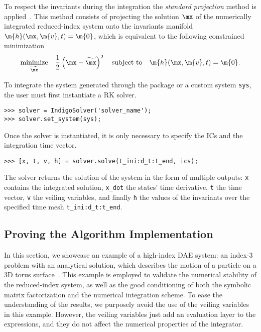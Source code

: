 To respect the invariants during the integration the \emph{standard projection} method is applied~\cite{hairer2000symmetric}. This method consists of projecting the solution $\mx$ of the numerically integrated reduced-index system onto the invariants manifold $\m{h}(\mx, \m{v}, t) = \m{0}$, which is equivalent to the following constrained minimization
%
\begin{equation*}
  \underset{\widetilde{\mx}}{\textrm{minimize}} \quad \dfrac{1}{2}\left(\mx - \widetilde{\mx}\right)^2
    \quad \textrm{subject to} \quad
    \m{h}(\mx, \m{v}, t) = \m{0}.
\end{equation*}

To integrate the system generated through the \Matlab{} package or a custom system \texttt{sys}, the user must first instantiate a \Indigo{} \ac{RK} solver.
%
\begin{verbatim}
>>> solver = IndigoSolver('solver_name');
>>> solver.set_system(sys);
\end{verbatim}
%
Once the solver is instantiated, it is only necessary to specify the \acp{IC} and the integration time vector.
%
\begin{verbatim}
>>> [x, t, v, h] = solver.solve(t_ini:d_t:t_end, ics);
\end{verbatim}
%
The solver returns the solution of the system in the form of multiple outputs: \texttt{x} contains the integrated solution, \texttt{x\_dot} the states' time derivative, \texttt{t} the time vector, \texttt{v} the veiling variables, and finally \texttt{h} the values of the invariants over the specified time mesh \texttt{t\_ini:d\_t:t\_end}.

\subsection{Proving the Algorithm Implementation}
\label{chap4:sec:example}

In this section, we showcase an example of a high-index \ac{DAE} system: an index-3 problem with an analytical solution, which describes the motion of a particle on a 3D torus surface~\cite{campbell1995constraint}. This example is employed to validate the numerical stability of the reduced-index system, as well as the good conditioning of both the symbolic matrix factorization and the numerical integration scheme. To ease the understanding of the results, we purposely avoid the use of the veiling variables in this example. However, the veiling variables just add an evaluation layer to the expressions, and they do not affect the numerical properties of the integrator.

